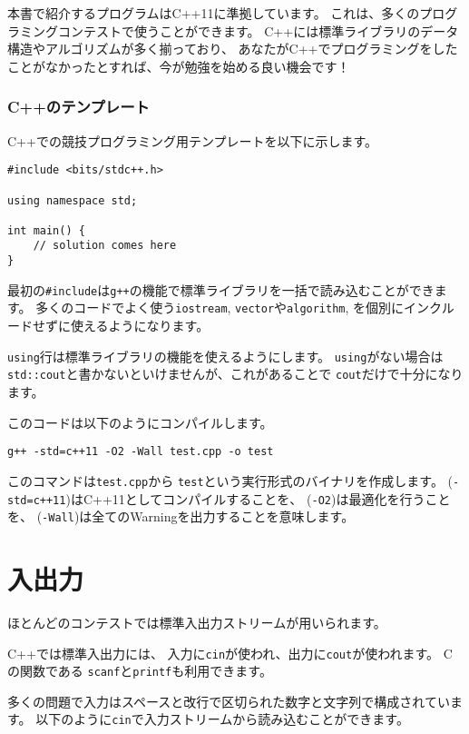 本書で紹介するプログラムはC++11に準拠しています。
これは、多くのプログラミングコンテストで使うことができます。
C++には標準ライブラリのデータ構造やアルゴリズムが多く揃っており、
あなたがC++でプログラミングをしたことがなかったとすれば、今が勉強を始める良い機会です！

\subsubsection{C++のテンプレート}

C++での競技プログラミング用テンプレートを以下に示します。

\begin{lstlisting}
#include <bits/stdc++.h>

using namespace std;

int main() {
    // solution comes here
}
\end{lstlisting}

最初の\texttt{\#include}は\texttt{g++}の機能で標準ライブラリを一括で読み込むことができます。
多くのコードでよく使う\texttt{iostream},
\texttt{vector}や\texttt{algorithm},
を個別にインクルードせずに使えるようになります。

\texttt{using}行は標準ライブラリの機能を使えるようにします。
\texttt{using}がない場合は
\texttt{std::cout}と書かないといけませんが、これがあることで
\texttt{cout}だけで十分になります。

このコードは以下のようにコンパイルします。

\begin{lstlisting}
g++ -std=c++11 -O2 -Wall test.cpp -o test
\end{lstlisting}

このコマンドは\texttt{test.cpp}から
\texttt{test}という実行形式のバイナリを作成します。
(\texttt{-std=c++11})はC++11としてコンパイルすることを、
(\texttt{-O2})は最適化を行うことを、
(\texttt{-Wall})は全てのWarningを出力することを意味します。

\section{入出力}


ほとんどのコンテストでは標準入出力ストリームが用いられます。

C++では標準入出力には、
入力に\texttt{cin}が使われ、出力に\texttt{cout}が使われます。
Cの関数である
\texttt{scanf}と\texttt{printf}も利用できます。

多くの問題で入力はスペースと改行で区切られた数字と文字列で構成されています。
以下のように\texttt{cin}で入力ストリームから読み込むことができます。

